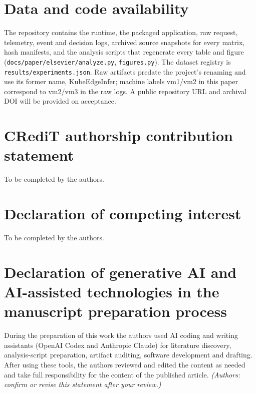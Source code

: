 \documentclass[preprint,12pt]{elsarticle}
\begin{document}
\hypertarget{data-and-code-availability}{%
\section{Data and code availability}\label{data-and-code-availability}}

The repository contains the runtime, the packaged application, raw
request, telemetry, event and decision logs, archived source snapshots
for every matrix, hash manifests, and the analysis scripts that
regenerate every table and figure
(\texttt{docs/paper/elsevier/analyze.py}, \texttt{figures.py}). The
dataset registry is \texttt{results/experiments.json}. Raw artifacts
predate the project's renaming and use its former name, KubeEdgeInfer;
machine labels vm1/vm2 in this paper correspond to vm2/vm3 in the raw
logs. A public repository URL and archival DOI will be provided on
acceptance.

\hypertarget{credit-authorship-contribution-statement}{%
\section{CRediT authorship contribution
statement}\label{credit-authorship-contribution-statement}}

To be completed by the authors.

\hypertarget{declaration-of-competing-interest}{%
\section{Declaration of competing
interest}\label{declaration-of-competing-interest}}

To be completed by the authors.

\hypertarget{declaration-of-generative-ai-and-ai-assisted-technologies-in-the-manuscript-preparation-process}{%
\section{Declaration of generative AI and AI-assisted technologies in
the manuscript preparation
process}\label{declaration-of-generative-ai-and-ai-assisted-technologies-in-the-manuscript-preparation-process}}

During the preparation of this work the authors used AI coding and
writing assistants (OpenAI Codex and Anthropic Claude) for literature
discovery, analysis-script preparation, artifact auditing, software
development and drafting. After using these tools, the authors reviewed
and edited the content as needed and take full responsibility for the
content of the published article. \emph{(Authors: confirm or revise this
statement after your review.)}



\end{document}
